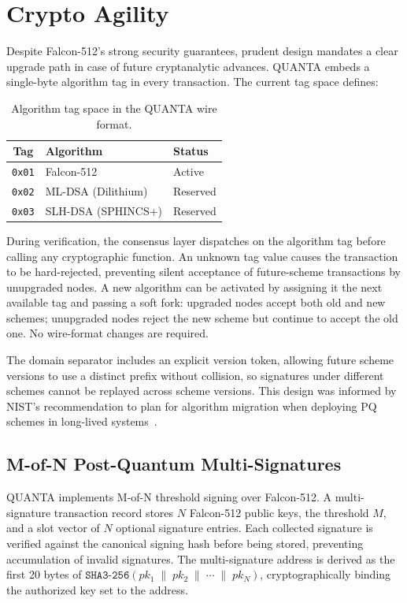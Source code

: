 \documentclass[11pt,a4paper]{article}
\begin{document}
\section{Crypto Agility}
\label{sec:agility}

Despite Falcon-512's strong security guarantees, prudent design mandates a
clear upgrade path in case of future cryptanalytic advances. QUANTA embeds a
single-byte algorithm tag in every transaction. The current tag space defines:

\begin{table}[h]
\centering
\begin{tabular}{@{}cll@{}}
\toprule
\textbf{Tag} & \textbf{Algorithm} & \textbf{Status} \\
\midrule
\texttt{0x01} & Falcon-512  & Active \\
\texttt{0x02} & ML-DSA (Dilithium) & Reserved \\
\texttt{0x03} & SLH-DSA (SPHINCS+) & Reserved \\
\bottomrule
\end{tabular}
\caption{Algorithm tag space in the QUANTA wire format.}
\end{table}

During verification, the consensus layer dispatches on the algorithm tag
before calling any cryptographic function. An unknown tag value causes the
transaction to be hard-rejected, preventing silent acceptance of future-scheme
transactions by unupgraded nodes. A new algorithm can be activated by
assigning it the next available tag and passing a soft fork: upgraded nodes
accept both old and new schemes; unupgraded nodes reject the new scheme but
continue to accept the old one. No wire-format changes are required.

The domain separator includes an explicit version token, allowing future
scheme versions to use a distinct prefix without collision, so signatures under
different schemes cannot be replayed across scheme versions. This design was
informed by NIST's recommendation to plan for algorithm migration when
deploying PQ schemes in long-lived systems~\cite{fips206}.

\subsection{M-of-N Post-Quantum Multi-Signatures}

QUANTA implements M-of-N threshold signing over Falcon-512. A multi-signature
transaction record stores $N$ Falcon-512 public keys, the threshold $M$, and a
slot vector of $N$ optional signature entries. Each collected signature is
verified against the canonical signing hash before being stored, preventing
accumulation of invalid signatures. The multi-signature address is derived as
the first 20 bytes of
$\texttt{SHA3-256}(pk_1 \;\|\; pk_2 \;\|\; \cdots \;\|\; pk_N)$,
cryptographically binding the authorized key set to the address.
\end{document}
